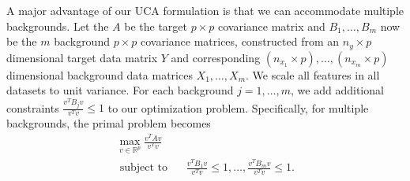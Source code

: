 \documentclass[10pt]{article}
\begin{document}


A major advantage of our UCA formulation is that we can accommodate multiple backgrounds. Let the $A$ be the target $p \times p$ covariance matrix and $ B_1, \ldots, B_m$ now be the $m$ background $p \times p$ covariance matrices, constructed from an $n_y \times p$ dimensional target data matrix $Y$ and corresponding $(n_{x_1} \times p), \ldots, (n_{x_m}\times p)$ dimensional background data matrices $X_1, \ldots, X_m$. We scale all features in all datasets to unit variance.
For each background $j = 1, \ldots, m$, we add additional constraints $\frac{v^TB_jv}{v^Tv}\leq 1$ to our optimization problem. Specifically, for multiple backgrounds, the primal problem becomes
\begin{equation}
  \label{eq:4}
  \begin{aligned}
  \max_{v\in \mathbb{R}^p}{\frac{v^TAv}{v^T v}} \\ \text{ subject to }\; \; &\frac{v^TB_1 v}{v^T v} \leq 1, \ldots, \frac{v^T B_m v}{v^T v}\leq 1.
  \end{aligned}
\end{equation}
\end{document}
